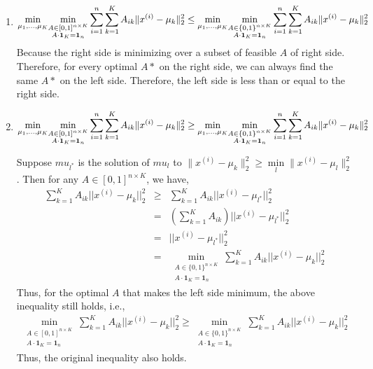 \documentclass[12pt]{article}
\begin{document}
\begin{enumerate}
    \item 
    \begin{align}
        \underset{\mu_1, ..., \mu_K}{\min}\underset{\substack{A \in [0,1]^{n\times K} \\ A\cdot\mathbf{1}_K= \mathbf{1}_n}}{\min}\sum_{i=1}^n\sum_{k=1}^K A_{ik}\|x^{(i)} - \mu_k\|^2_2 \leq \underset{\mu_1, ..., \mu_K}{\min}\underset{\substack{A \in \{0,1\}^{n\times K} \\ A\cdot\mathbf{1}_K= \mathbf{1}_n}}{\min}\sum_{i=1}^n\sum_{k=1}^K A_{ik}\|x^{(i)} - \mu_k\|^2_2\notag
    \end{align} 
    Because the right side is minimizing over a subset of feasible $A$ of right side. Therefore, for every optimal $A*$ on the right side, we can always find the same $A*$ on the left side. Therefore, the left side is less than or equal to the right side.

    \item 
    \begin{align}
        \underset{\mu_1, ..., \mu_K}{\min}\underset{\substack{A \in [0,1]^{n\times K} \\ A\cdot\mathbf{1}_K= \mathbf{1}_n}}{\min}\sum_{i=1}^n\sum_{k=1}^K A_{ik}\|x^{(i)} - \mu_k\|^2_2 \geq \underset{\mu_1, ..., \mu_K}{\min}\underset{\substack{A \in \{0,1\}^{n\times K} \\ A\cdot\mathbf{1}_K= \mathbf{1}_n}}{\min}\sum_{i=1}^n\sum_{k=1}^K A_{ik}\|x^{(i)} - \mu_k\|^2_2\notag
    \end{align}
    
    Suppose $mu_{l^*}$ is the solution of $mu_l$ to $\|x^{(i)} - \mu_k\|^2_2 \geq \underset{l}{\min}\|x^{(i)} - \mu_l\|^2_2$. Then for any $A \in [0,1]^{n\times K}$, we have,
    \begin{eqnarray}
        \sum_{k=1}^K A_{ik}||x^{(i)} - \mu_k||^2_2 &\geq& \sum_{k=1}^K A_{ik}||x^{(i)} - \mu_{l^*}||^2_2 \nonumber\\
        &=& (\sum_{k=1}^K A_{ik})||x^{(i)} - \mu_{l^*}||^2_2 \nonumber\\
        &=& ||x^{(i)} - \mu_{l^*}||^2_2 \nonumber \\
        &=& \underset{\substack{A \in \{0,1\}^{n\times K} \\ A\cdot\mathbf{1}_K= \mathbf{1}_n}}{\min} \sum_{k=1}^K A_{ik} ||x^{(i)} - \mu_{k}||^2_2 \nonumber
    \end{eqnarray}
    Thus, for the optimal $A$ that makes the left side minimum, the above inequality still holds, i.e.,
    \begin{align}
        \underset{\substack{A \in [0,1]^{n\times K} \\ A\cdot\mathbf{1}_K= \mathbf{1}_n}}{\min} \sum_{k=1}^K A_{ik} ||x^{(i)} - \mu_{k}||^2_2 \geq \underset{\substack{A \in \{0,1\}^{n\times K} \\ A\cdot\mathbf{1}_K= \mathbf{1}_n}}{\min} \sum_{k=1}^K A_{ik} ||x^{(i)} - \mu_{k}||^2_2 \nonumber
    \end{align} Thus, the original inequality also holds.


\end{enumerate}
\end{document}
